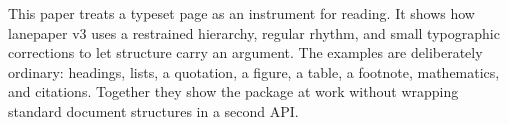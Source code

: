 
\thispagestyle{empty}

\titlefootnotesetup

\begin{center}

\vspace*{\titlespaceminor}



\articledate{\today}

\begin{articleabstract}
This paper treats a typeset page as an instrument for reading.
It shows how lanepaper v3 uses a restrained hierarchy, regular rhythm, and
small typographic corrections to let structure carry an argument.
The examples are deliberately ordinary: headings, lists, a quotation, a
figure, a table, a footnote, mathematics, and citations.
Together they show the package at work without wrapping standard document
structures in a second API.
\end{articleabstract}


\end{center}

\clearpage

\titlefootnotereset
